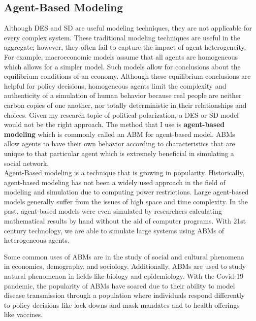 \subsection{Agent-Based Modeling}
Although DES and SD are useful modeling techniques, they are not applicable for every complex system. These traditional modeling techniques are useful in the aggregate; however, they often fail to capture the impact of agent heterogeneity. For example, macroeconomic models assume that all agents are homogeneous which allows for a simpler model. Such models allow for conclusions about the equilibrium conditions of an economy. Although these equilibrium conclusions are helpful for policy decisions, homogeneous agents limit the complexity and authenticity of a simulation of human behavior because real people are neither carbon copies of one another, nor totally deterministic in their relationships and choices. Given my research topic of political polarization, a DES or SD model would not be the right approach. The method that I use is \textbf{agent-based modeling} which is commonly called an ABM for agent-based model. ABMs allow agents to have their own behavior according to characteristics that are unique to that particular agent which is extremely beneficial in simulating a social network. \\

Agent-Based modeling is a technique that is growing in popularity. Historically, agent-based modeling has not been a widely used approach in the field of modeling and simulation due to computing power restrictions. Large agent-based models generally suffer from the issues of high space and time complexity. In the past, agent-based models were even simulated by researchers calculating mathematical results by hand without the aid of computer programs. With 21st century technology, we are able to simulate large systems using ABMs of heterogeneous agents. 

Some common uses of ABMs are in the study of social and cultural phenomena in economics, demography, and sociology. Additionally, ABMs are used to study natural phenomenon in fields like biology and epidemiology. With the Covid-19 pandemic, the popularity of ABMs have soared due to their ability to model disease transmission through a population where individuals respond differently to policy decisions like lock downs and mask mandates and to health offerings like vaccines. 

